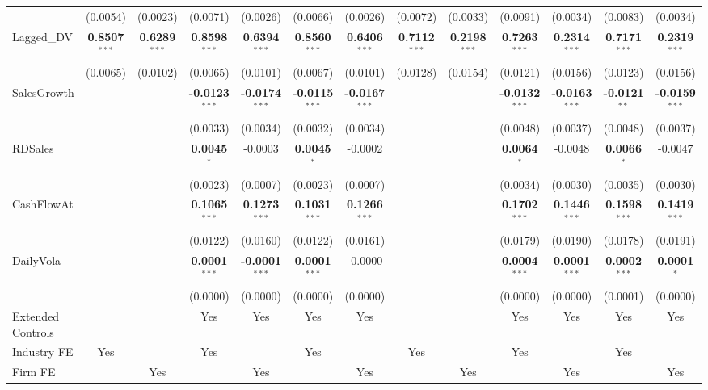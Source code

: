 \documentclass[11pt,a4paper]{article}
\begin{document}
\begin{table}[htbp]
\begin{tabular}{lcccccccccccc}
 & (0.0054) & (0.0023) & (0.0071) & (0.0026) & (0.0066) & (0.0026) & (0.0072) & (0.0033) & (0.0091) & (0.0034) & (0.0083) & (0.0034) \\
Lagged\_DV & \textbf{0.8507}$^{***}$ & \textbf{0.6289}$^{***}$ & \textbf{0.8598}$^{***}$ & \textbf{0.6394}$^{***}$ & \textbf{0.8560}$^{***}$ & \textbf{0.6406}$^{***}$ & \textbf{0.7112}$^{***}$ & \textbf{0.2198}$^{***}$ & \textbf{0.7263}$^{***}$ & \textbf{0.2314}$^{***}$ & \textbf{0.7171}$^{***}$ & \textbf{0.2319}$^{***}$ \\
 & (0.0065) & (0.0102) & (0.0065) & (0.0101) & (0.0067) & (0.0101) & (0.0128) & (0.0154) & (0.0121) & (0.0156) & (0.0123) & (0.0156) \\
SalesGrowth &  &  & \textbf{-0.0123}$^{***}$ & \textbf{-0.0174}$^{***}$ & \textbf{-0.0115}$^{***}$ & \textbf{-0.0167}$^{***}$ &  &  & \textbf{-0.0132}$^{***}$ & \textbf{-0.0163}$^{***}$ & \textbf{-0.0121}$^{**}$ & \textbf{-0.0159}$^{***}$ \\
 &  &  & (0.0033) & (0.0034) & (0.0032) & (0.0034) &  &  & (0.0048) & (0.0037) & (0.0048) & (0.0037) \\
RDSales &  &  & \textbf{0.0045}$^{*}$ & -0.0003 & \textbf{0.0045}$^{*}$ & -0.0002 &  &  & \textbf{0.0064}$^{*}$ & -0.0048 & \textbf{0.0066}$^{*}$ & -0.0047 \\
 &  &  & (0.0023) & (0.0007) & (0.0023) & (0.0007) &  &  & (0.0034) & (0.0030) & (0.0035) & (0.0030) \\
CashFlowAt &  &  & \textbf{0.1065}$^{***}$ & \textbf{0.1273}$^{***}$ & \textbf{0.1031}$^{***}$ & \textbf{0.1266}$^{***}$ &  &  & \textbf{0.1702}$^{***}$ & \textbf{0.1446}$^{***}$ & \textbf{0.1598}$^{***}$ & \textbf{0.1419}$^{***}$ \\
 &  &  & (0.0122) & (0.0160) & (0.0122) & (0.0161) &  &  & (0.0179) & (0.0190) & (0.0178) & (0.0191) \\
DailyVola &  &  & \textbf{0.0001}$^{***}$ & \textbf{-0.0001}$^{***}$ & \textbf{0.0001}$^{***}$ & -0.0000 &  &  & \textbf{0.0004}$^{***}$ & \textbf{0.0001}$^{***}$ & \textbf{0.0002}$^{***}$ & \textbf{0.0001}$^{*}$ \\
 &  &  & (0.0000) & (0.0000) & (0.0000) & (0.0000) &  &  & (0.0000) & (0.0000) & (0.0001) & (0.0000) \\
\midrule
Extended Controls &  &  & Yes & Yes & Yes & Yes &  &  & Yes & Yes & Yes & Yes \\
Industry FE & Yes &  & Yes &  & Yes &  & Yes &  & Yes &  & Yes &  \\
Firm FE &  & Yes &  & Yes &  & Yes &  & Yes &  & Yes &  & Yes \\

\end{tabular}
\end{table}
\end{document}
